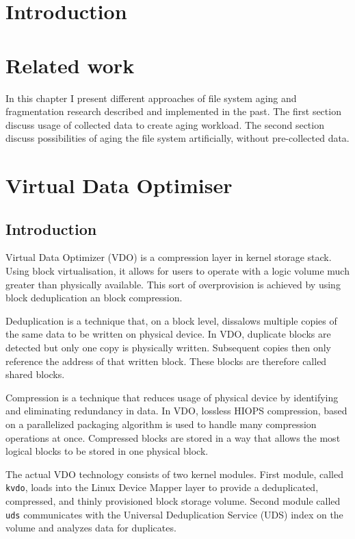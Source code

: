 \documentclass[
  color, %
  table, %
  lof,   %
  lot,   %
]{fithesis3}
\begin{document}
\chapter{Introduction}




\chapter{Related work}
\label{related}
In this chapter I present different approaches of file system aging and fragmentation research described and implemented in the past. The first section discuss usage of collected data to create aging workload. The second section discuss possibilities of aging the file system artificially, without pre-collected data.




\chapter{Virtual Data Optimiser}
\label{VDO}
\section{Introduction}
Virtual Data Optimizer (VDO) is a compression layer in kernel storage stack. Using block virtualisation, it allows for users to operate with a logic volume much greater than physically available. This sort of overprovision is achieved by using block deduplication an block compression.

Deduplication is a technique that, on a block level, dissalows multiple copies of the same data to be written on physical device. In VDO, duplicate blocks are detected but only one copy is physically written. Subsequent copies then only reference the address of that written block. These blocks are therefore called shared blocks.

Compression is a technique that reduces usage of physical device by identifying and eliminating redundancy in data. In VDO, lossless HIOPS compression, based on a parallelized packaging algorithm is used to handle many compression operations at once. Compressed blocks are stored in a way that allows the most logical blocks to be stored in one physical block.

The actual VDO technology consists of two kernel modules. First module, called \texttt{kvdo}, loads into the Linux Device Mapper layer to provide a deduplicated, compressed, and thinly provisioned block storage volume. Second module called \texttt{uds} communicates with the Universal Deduplication Service (UDS) index on the volume and analyzes data for duplicates.
\end{document}
